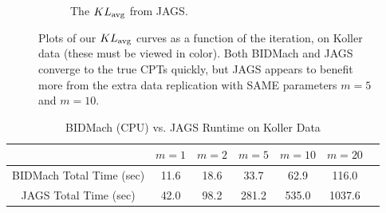 \documentclass{article} %
\begin{document}
\begin{figure}[t]
\begin{subfigure}{.5\textwidth}
  \caption{The $KL_{\rm avg}$ from JAGS.}
  \label{fig:kl_jags}
\end{subfigure}
\caption{Plots of our $KL_{\rm avg}$ curves as a function of the iteration, on Koller data (these
must be viewed in color). Both BIDMach and JAGS converge to the true CPTs quickly, but JAGS appears
to benefit more from the extra data replication with SAME parameters $m=5$ and $m=10$.}
\label{fig:first_set}
\end{figure}

%
%
%
%
%
%
%
%
\begin{table}[t]
\small
\caption{BIDMach (CPU) vs. JAGS Runtime on Koller Data}
\label{tab:bidmach_jags_koller}
\begin{center}
\begin{tabular}{ |c|c|c|c|c|c|c| } 
\hline
                         & $m=1$ & $m=2$ & $m=5$ & $m=10$ & $m=20$ \\
\hline \hline
BIDMach Total Time (sec) & 11.6  & 18.6  & 33.7  & 62.9   & 116.0  \\ 
JAGS Total Time (sec)    & 42.0  & 98.2  & 281.2 & 535.0  & 1037.6 \\
\hline
\end{tabular}
\end{center}
\end{table}
\end{document}

